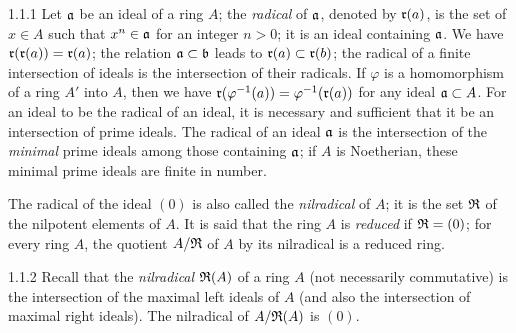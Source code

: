 \documentclass[../main.tex]{subfiles}
\begin{document}
\begin{cx}{1.1.1}
Let $\mathfrak{a}$ be an ideal of a ring $A$; the \emph{radical} of $\mathfrak{a}$, denoted
by $\mathfrak{r}(a)$, is the set of $x\in A$ such that $x^n\in\mathfrak{a}$ for an integer $n>0$; it is an
ideal containing $\mathfrak{a}$. We have $\mathfrak{r}(\mathfrak{r}(a))=\mathfrak{r}(a)$; the relation $\mathfrak{a}\subset\mathfrak{b}$
leads to $\mathfrak{r}(a)\subset\mathfrak{r}(b)$; the radical of a finite intersection of ideals is the
intersection of their radicals. If $\varphi$  is a homomorphism of a ring $A'$ into $A$, then we
have $\mathfrak{r}(\varphi^{-1}(a))=\varphi^{-1}(\mathfrak{r}(a))$
for any ideal $\mathfrak{a}\subset A$. For an ideal to be the radical of an ideal,
it is necessary and sufficient that it be an intersection of prime ideals. The radical of an
ideal $\mathfrak{a}$ is the intersection of the
\emph{minimal} prime ideals among those containing $\mathfrak{a}$; if $A$ is
Noetherian, these minimal prime ideals are finite in number.

The radical of the ideal $(0)$ is also called the \emph{nilradical} of $A$; it is the set
$\mathfrak{R}$ of the nilpotent elements of $A$. It is said that the ring $A$ is \emph{reduced} if
$\mathfrak{R}=(0)$; for every ring $A$, the quotient $A/\mathfrak{R}$ of $A$ by its nilradical is a
reduced ring.
\end{cx}

\begin{cx}{1.1.2}
Recall that the \emph{nilradical} $\mathfrak{R}(A)$ of a ring $A$ (not necessarily commutative) is the
intersection of the maximal left ideals of $A$ (and also the intersection of maximal
right ideals). The nilradical of $A/\mathfrak{R}(A)$ is $(0)$.
\end{cx}
\end{document}
